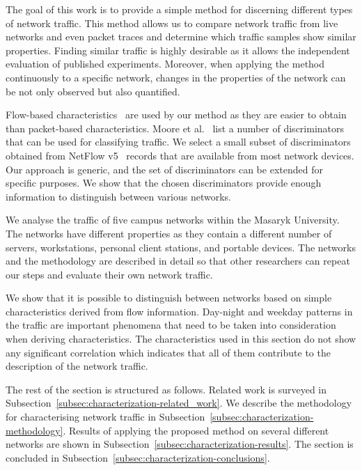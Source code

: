The goal of this work is to provide a simple method for discerning different types of network traffic. This method allows us to compare network traffic from live networks and even packet traces and determine which traffic samples show similar properties. Finding similar traffic is highly desirable as it allows the independent evaluation of published experiments. Moreover, when applying the method continuously to a specific network, changes in the properties of the network can be not only observed but also quantified.

Flow-based characteristics~\cite{Hofstede-2014-Flow} are used by our method as they are easier to obtain than packet-based characteristics. Moore et al.~\cite{Moore-2005-Discriminators} list a number of discriminators that can be used for classifying traffic. We select a small subset of discriminators obtained from NetFlow v5~\cite{CiscoSystems-2007-NetFlow} records that are available from most network devices. Our approach is generic, and the set of discriminators can be extended for specific purposes. We show that the chosen discriminators provide enough information to distinguish between various networks.

We analyse the traffic of five campus networks within the Masaryk University. The networks have different properties as they contain a different number of servers, workstations, personal client stations, and portable devices. The networks and the methodology are described in detail so that other researchers can repeat our steps and evaluate their own network traffic.

We show that it is possible to distinguish between networks based on simple characteristics derived from flow information. Day-night and weekday patterns in the traffic are important phenomena that need to be taken into consideration when deriving characteristics. The characteristics used in this section do not show any significant correlation which indicates that all of them contribute to the description of the network traffic.

The rest of the section is structured as follows. Related work is surveyed in Subsection~\ref{subsec:characterization-related_work}. We describe the methodology for characterising network traffic in Subsection~\ref{subsec:characterization-methodology}. Results of applying the proposed method on several different networks are shown in Subsection~\ref{subsec:characterization-results}. The section is concluded in Subsection~\ref{subsec:characterization-conclusions}.


